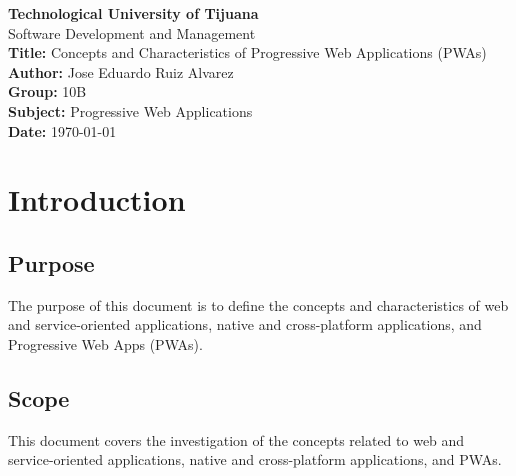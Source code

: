 \documentclass[12pt, a4paper, twoside]{article}
\date{}
\begin{document}

\maketitle

\begin{center}
\Large \textbf{Technological University of Tijuana} \\
\large Software Development and Management \\
\vspace{1cm}
\Large \textbf{Title:} Concepts and Characteristics of Progressive Web Applications (PWAs) \\
\vspace{1cm}
\large \textbf{Author:} Jose Eduardo Ruiz Alvarez \\
\large \textbf{Group:} 10B \\
\large \textbf{Subject:} Progressive Web Applications \\
\vspace{1.5cm}
\large \textbf{Date:} \today
\end{center}

\newpage
\tableofcontents

\newpage

\section{Introduction}
\label{sec:introduction}

\subsection{Purpose}
\label{sec:purpose}

The purpose of this document is to define the concepts and characteristics of web and service-oriented applications, native and cross-platform applications, and Progressive Web Apps (PWAs).

\subsection{Scope}
\label{sec:scope}

This document covers the investigation of the concepts related to web and service-oriented applications, native and cross-platform applications, and PWAs.
\end{document}
